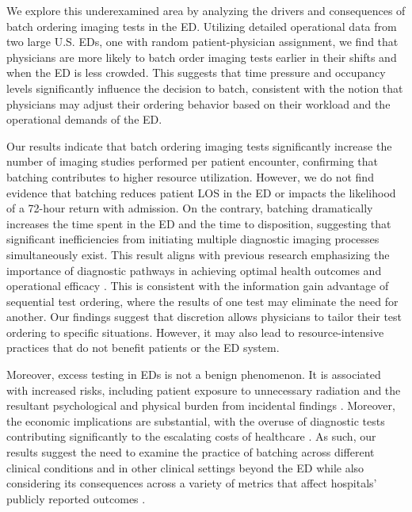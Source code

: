 \documentclass[,,nonblindrev]{informs}
\begin{document}
We explore this underexamined area by analyzing the drivers and
consequences of batch ordering imaging tests in the ED. Utilizing
detailed operational data from two large U.S. EDs, one with random
patient-physician assignment, we find that physicians are more likely to
batch order imaging tests earlier in their shifts and when the ED is
less crowded. This suggests that time pressure and occupancy levels
significantly influence the decision to batch, consistent with the
notion that physicians may adjust their ordering behavior based on their
workload and the operational demands of the ED.

Our results indicate that batch ordering imaging tests significantly
increase the number of imaging studies performed per patient encounter,
confirming that batching contributes to higher resource utilization.
However, we do not find evidence that batching reduces patient LOS in
the ED or impacts the likelihood of a 72-hour return with admission. On
the contrary, batching dramatically increases the time spent in the ED
and the time to disposition, suggesting that significant inefficiencies
from initiating multiple diagnostic imaging processes simultaneously
exist. This result aligns with previous research emphasizing the
importance of diagnostic pathways in achieving optimal health outcomes
and operational efficacy \citep[\citet{Masic2008},
\citet{Singh2015}]{Carpenter2015}. This is consistent with the
information gain advantage of sequential test ordering, where the
results of one test may eliminate the need for another. Our findings
suggest that discretion allows physicians to tailor their test ordering
to specific situations. However, it may also lead to resource-intensive
practices that do not benefit patients or the ED system.

Moreover, excess testing in EDs is not a benign phenomenon. It is
associated with increased risks, including patient exposure to
unnecessary radiation and the resultant psychological and physical
burden from incidental findings \citep{Mus2011}. Moreover, the economic
implications are substantial, with the overuse of diagnostic tests
contributing significantly to the escalating costs of healthcare
\citep{Atkinson2023}. As such, our results suggest the need to examine
the practice of batching across different clinical conditions and in
other clinical settings beyond the ED while also considering its
consequences across a variety of metrics that affect hospitals' publicly
reported outcomes \citep[\citet{saghafian2019role}]{Saghafian2019}.
\end{document}
